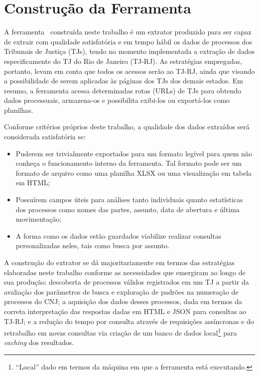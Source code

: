 \chapter{Construção da Ferramenta \tjscraper~\label{chp:construção-da-ferramenta}}

A ferramenta \tjscraper~construída neste trabalho é um extrator produzido para
ser capaz de extrair com qualidade satisfatória e em tempo hábil os dados de
processos dos Tribunais de Justiça (TJs), tendo no momento implementada a
extração de dados especificamente do TJ do Rio de Janeiro (TJ-RJ). As
estratégias empregadas, portanto, levam em conta que todos os acessos serão ao
TJ-RJ, ainda que visando a possibilidade de serem aplicadas às páginas dos TJs
dos demais estados. Em resumo, a ferramenta acessa determinadas rotas (URLs) de
TJs para obtendo dados processuais, armazena-os e possibilita exibi-los ou
exportá-los como planilhas.

Conforme critérios próprios deste trabalho, a qualidade dos dados extraídos
será considerada satisfatória se:

\begin{itemize}
    \item Puderem ser trivialmente exportados para um formato legível para quem
        não conheça o funcionamento interno da ferramenta. Tal formato pode ser
        um formato de arquivo como uma planilha XLSX ou uma visualização em
        tabela em HTML;
    \item Possuírem campos úteis para análises tanto individuais quanto
        estatísticas dos processos como nomes das partes, assunto, data de
        abertura e última movimentação;
    \item A forma como os dados estão guardados viabilize realizar consultas
        personalizadas neles, tais como busca por assunto.
\end{itemize}

A construção do extrator se dá majoritariamente em termos das estratégias
elaboradas neste trabalho conforme as necessidades que emergiram ao longo de
sua produção: descoberta de processos válidos registrados em um TJ a partir da
avaliação dos parâmetros de busca e exploração de padrões na numeração de
processos do CNJ; a aquisição dos dados desses processos, dada em termos da
correta interpretação das respostas dadas em HTML e JSON para consultas ao
TJ-RJ; e a redução do tempo por consulta através de requisições assíncronas e
do retrabalho em novas consultas via criação de um banco de dados
local\footnote{``Local'' dado em termos da máquina em que a ferramenta está
executando.} para \textit{caching} dos resultados.

